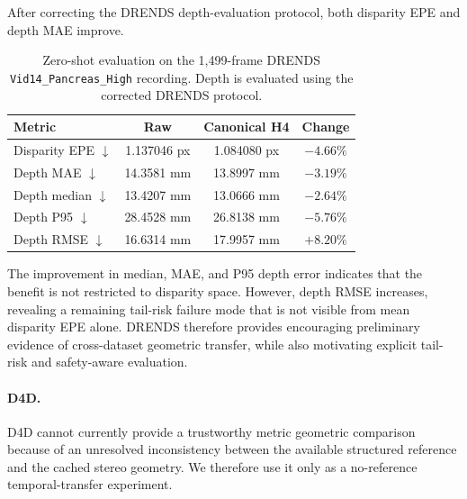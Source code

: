 \documentclass[11pt,a4paper]{article}
\begin{document}
After correcting the DRENDS depth-evaluation protocol, both disparity
EPE and depth MAE improve.

\begin{table}[t]
    \centering
    \caption{
        Zero-shot evaluation on the 1,499-frame DRENDS
        \texttt{Vid14\_Pancreas\_High} recording.
        Depth is evaluated using the corrected DRENDS protocol.
    }
    \label{tab:drends_current}
    \small
    \begin{tabular}{lccc}
        \toprule
        Metric &
        Raw &
        Canonical H4 &
        Change \\
        \midrule
        Disparity EPE $\downarrow$
            & 1.137046 px
            & 1.084080 px
            & $-4.66\%$ \\

        Depth MAE $\downarrow$
            & 14.3581 mm
            & 13.8997 mm
            & $-3.19\%$ \\

        Depth median $\downarrow$
            & 13.4207 mm
            & 13.0666 mm
            & $-2.64\%$ \\

        Depth P95 $\downarrow$
            & 28.4528 mm
            & 26.8138 mm
            & $-5.76\%$ \\

        Depth RMSE $\downarrow$
            & 16.6314 mm
            & 17.9957 mm
            & $+8.20\%$ \\
        \bottomrule
    \end{tabular}
\end{table}

The improvement in median, MAE, and P95 depth error indicates that the
benefit is not restricted to disparity space.
However, depth RMSE increases, revealing a remaining tail-risk failure
mode that is not visible from mean disparity EPE alone.
DRENDS therefore provides encouraging preliminary evidence of
cross-dataset geometric transfer, while also motivating explicit
tail-risk and safety-aware evaluation.


\paragraph{D4D.}
D4D cannot currently provide a trustworthy metric geometric comparison
because of an unresolved inconsistency between the available structured
reference and the cached stereo geometry.
We therefore use it only as a no-reference temporal-transfer experiment.
\end{document}
